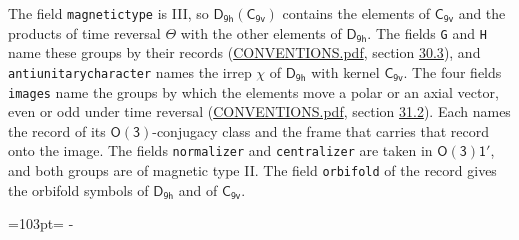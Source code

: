 \documentclass[10pt,a4paper]{article}
\newcommand{\needspace}[1]{\par\penalty-100\begingroup\dimen0=#1\relax\dimen2=\pagegoal
  \advance\dimen2-\pagetotal\ifdim\dimen0>\dimen2\relax\ifdim\dimen2>0pt\vfil\break\fi\fi
  \endgroup}
\numberwithin{equation}{section}
\newcommand{\grp}[1]{\mathsf{#1}}
\begin{document}
The field \texttt{magnetictype} is III, so $\grp{D_{9h}}(\grp{C_{9v}})$ contains the elements of $\grp{C_{9v}}$ and the products of time reversal $\varTheta$ with the other elements of $\grp{D_{9h}}$. The fields \texttt{G} and \texttt{H} name these groups by their records (\href{../../CONVENTIONS.pdf}{CONVENTIONS.pdf}, section \href{../../CONVENTIONS.pdf\#conv.30.3}{30.3}), and \texttt{antiunitarycharacter} names the irrep $\chi$ of $\grp{D_{9h}}$ with kernel $\grp{C_{9v}}$. The four fields \texttt{images} name the groups by which the elements move a polar or an axial vector, even or odd under time reversal (\href{../../CONVENTIONS.pdf}{CONVENTIONS.pdf}, section \href{../../CONVENTIONS.pdf\#conv.31.2}{31.2}). Each names the record of its $\grp{O(3)}$-conjugacy class and the frame that carries that record onto the image. The fields \texttt{normalizer} and \texttt{centralizer} are taken in $\grp{O(3)1'}$, and both groups are of magnetic type II. The field \texttt{orbifold} of the record gives the orbifold symbols of $\grp{D_{9h}}$ and of $\grp{C_{9v}}$.
\needspace{103pt}
\end{document}
